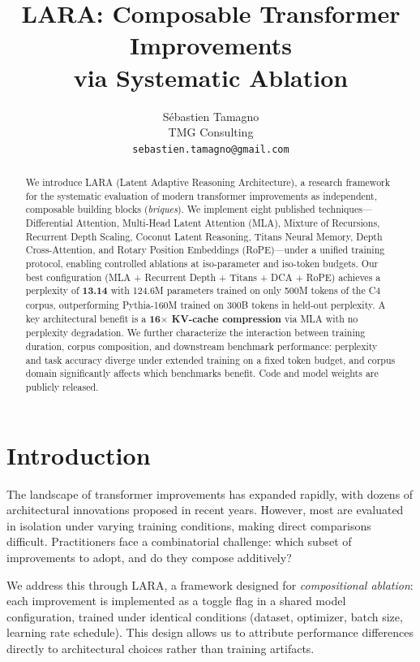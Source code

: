 \documentclass{article}
\title{LARA: Composable Transformer Improvements\\via Systematic Ablation}
\author{%
  Sébastien Tamagno \\
  TMG Consulting \\
  \texttt{sebastien.tamagno@gmail.com} \\
}
\begin{document}
\maketitle

\begin{abstract}
We introduce LARA (Latent Adaptive Reasoning Architecture), a research framework for the systematic evaluation of modern transformer improvements as independent, composable building blocks (\emph{briques}). We implement eight published techniques—Differential Attention, Multi-Head Latent Attention (MLA), Mixture of Recursions, Recurrent Depth Scaling, Coconut Latent Reasoning, Titans Neural Memory, Depth Cross-Attention, and Rotary Position Embeddings (RoPE)—under a unified training protocol, enabling controlled ablations at iso-parameter and iso-token budgets.
Our best configuration (MLA + Recurrent Depth + Titans + DCA + RoPE) achieves a perplexity of \textbf{13.14} with 124.6M parameters trained on only 500M tokens of the C4 corpus, outperforming Pythia-160M trained on 300B tokens in held-out perplexity. A key architectural benefit is a \textbf{16$\times$ KV-cache compression} via MLA with no perplexity degradation.
We further characterize the interaction between training duration, corpus composition, and downstream benchmark performance: perplexity and task accuracy diverge under extended training on a fixed token budget, and corpus domain significantly affects which benchmarks benefit. Code and model weights are publicly released.
\end{abstract}

\section{Introduction}

The landscape of transformer improvements has expanded rapidly, with dozens of architectural innovations proposed in recent years. However, most are evaluated in isolation under varying training conditions, making direct comparisons difficult. Practitioners face a combinatorial challenge: which subset of improvements to adopt, and do they compose additively?

We address this through LARA, a framework designed for \emph{compositional ablation}: each improvement is implemented as a toggle flag in a shared model configuration, trained under identical conditions (dataset, optimizer, batch size, learning rate schedule). This design allows us to attribute performance differences directly to architectural choices rather than training artifacts.
\end{document}
